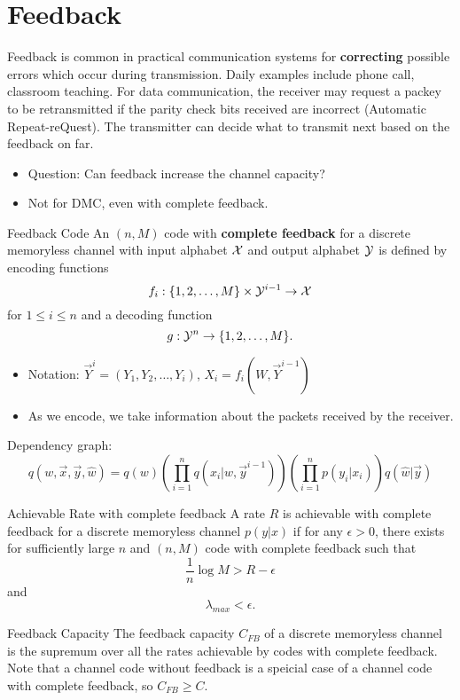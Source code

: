 \documentclass[../main.tex]{subfiles}
\begin{document}
 
 \section{Feedback}
Feedback is common in practical communication systems for \textbf{correcting} possible errors which occur during transmission. Daily examples include phone call, classroom teaching. 
\newline
For data communication, the receiver may request a packey to be retransmitted if the parity check bits received are incorrect (Automatic Repeat-reQuest). The transmitter can decide what to transmit next based on the feedback on far.
\begin{itemize}
    \item Question: Can feedback increase the channel capacity?
    \item Not for DMC, even with complete feedback.
\end{itemize}
\begin{gbox}{Feedback Code}
    An $(n,M)$ code with \textbf{complete feedback} for a discrete memoryless channel with input alphabet $\mathcal{X}$ and output alphabet $\mathcal{Y}$ is defined by encoding functions \[
    f_i:\{1,2,\dots,M\}\times \mathcal{Y}^{i-1}\to \mathcal{X}
    \]
    for $1\leq i\leq n$ and a decoding function \[
    g:\mathcal{Y}^n \to \{1,2,\dots, M\}.
    \]
\begin{itemize}
    \item Notation: $\vec Y^{i}=(Y_1,Y_2,\dots, Y_i)$, $X_i=f_i(W,\vec Y^{i-1})$
    \item As we encode, we take information about the packets received by the receiver.
\end{itemize}
\end{gbox}
Dependency graph:
\[
q(w,\vec x,\vec y,\hat{w}) = q(w)(\prod_{i=1}^n q(x_i|w,\vec y^{i-1}))(\prod_{i=1}^np(y_i|x_i))q(\hat{w}|\vec y)
\]
\begin{gbox}{Achievable Rate with complete feedback}
    A rate $R$ is achievable with complete feedback for a discrete memoryless channel $p(y|x)$ if for any $\epsilon > 0$, there exists for sufficiently large $n$ and $(n,M)$ code with complete feedback such that \[
    \frac{1}{n}\log M > R-\epsilon
    \] and \[
    \lambda_{max} < \epsilon.
    \]
\end{gbox}
\begin{gbox}{Feedback Capacity}
The feedback capacity $C_{FB}$ of a discrete memoryless channel is the supremum over all the rates achievable by codes with complete feedback.
\newline
Note that a channel code without feedback is a speicial case of a channel code with complete feedback, so $C_{FB}\geq C$.
\end{gbox}
\end{document}
